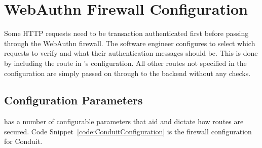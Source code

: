 
\section{WebAuthn Firewall Configuration}


Some HTTP requests need to be transaction authenticated first before passing through the WebAuthn firewall. The software engineer configures \sys{} to select which requests to verify and what their authentication messages should be. This is done by including the route in \sys{}'s configuration. All other routes not specified in the configuration are simply passed on through to the backend without any checks.





\subsection{Configuration Parameters}\label{Sec:ConfigurationParameters}

\sys{} has a number of configurable parameters that aid and dictate how routes are secured. Code Snippet~\ref{code:ConduitConfiguration} is the firewall configuration for Conduit.

